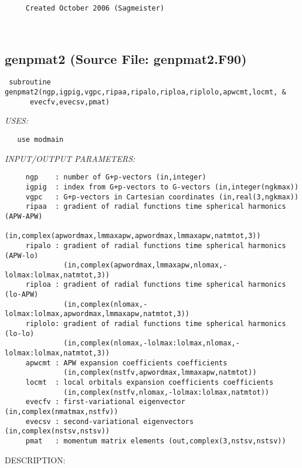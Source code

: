 \documentclass[11pt]{article}
\begin{document}
\begin{verbatim}     Created October 2006 (Sagmeister)\end{verbatim}












 
 
\mbox{}\hrulefill\ 
 
\subsection{genpmat2 (Source File: genpmat2.F90)}


\begin{verbatim} subroutine genpmat2(ngp,igpig,vgpc,ripaa,ripalo,riploa,riplolo,apwcmt,locmt, &
      evecfv,evecsv,pmat)\end{verbatim}{\em USES:}
\begin{verbatim}   use modmain\end{verbatim}{\em INPUT/OUTPUT PARAMETERS:}
\begin{verbatim}     ngp    : number of G+p-vectors (in,integer)
     igpig  : index from G+p-vectors to G-vectors (in,integer(ngkmax))
     vgpc   : G+p-vectors in Cartesian coordinates (in,real(3,ngkmax))
     ripaa  : gradient of radial functions time spherical harmonics (APW-APW)
              (in,complex(apwordmax,lmmaxapw,apwordmax,lmmaxapw,natmtot,3))
     ripalo : gradient of radial functions time spherical harmonics (APW-lo)
              (in,complex(apwordmax,lmmaxapw,nlomax,-lolmax:lolmax,natmtot,3))
     riploa : gradient of radial functions time spherical harmonics (lo-APW)
              (in,complex(nlomax,-lolmax:lolmax,apwordmax,lmmaxapw,natmtot,3))
     riplolo: gradient of radial functions time spherical harmonics (lo-lo)
              (in,complex(nlomax,-lolmax:lolmax,nlomax,-lolmax:lolmax,natmtot,3))
     apwcmt : APW expansion coefficients coefficients
              (in,complex(nstfv,apwordmax,lmmaxapw,natmtot))
     locmt  : local orbitals expansion coefficients coefficients
              (in,complex(nstfv,nlomax,-lolmax:lolmax,natmtot))
     evecfv : first-variational eigenvector (in,complex(nmatmax,nstfv))
     evecsv : second-variational eigenvectors (in,complex(nstsv,nstsv))
     pmat   : momentum matrix elements (out,complex(3,nstsv,nstsv))\end{verbatim}
{\sf DESCRIPTION:\\ }
\end{document}
